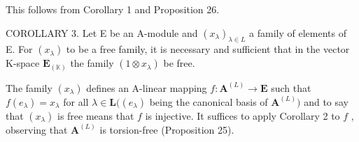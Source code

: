 This follows from Corollary 1 and Proposition 26.

COROLLARY 3. Let E be an A-module and \((x_{\lambda})_{\lambda \in L}\) a family of elements of E. For \((x_{\lambda})\) to be a free family, it is necessary and sufficient that in the vector K-space \(\mathbf{E}_{(\mathbb{K})}\) the family \((1 \otimes x_{\lambda})\) be free.

The family \((x_{\lambda})\) defines an A-linear mapping \(f: \mathbf{A}^{(L)} \to \mathbf{E}\) such that \(f(e_{\lambda}) = x_{\lambda}\) for all \(\lambda \in \mathbf{L}((e_{\lambda})\) being the canonical basis of \(\mathbf{A}^{(L)})\) and to say that \((x_{\lambda})\) is free means that \(f\) is injective. It suffices to apply Corollary 2 to \(f\) , observing that \(\mathbf{A}^{(L)}\) is torsion-free (Proposition 25).

